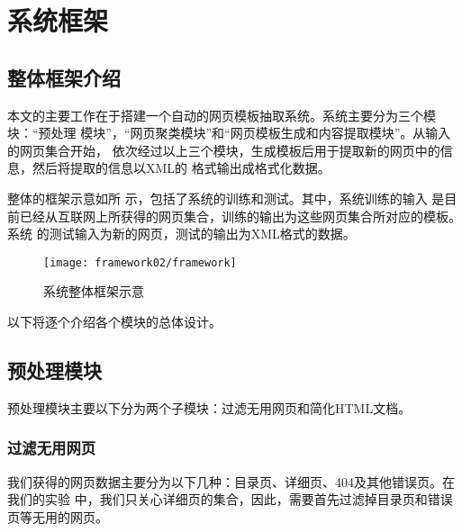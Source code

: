 
\chapter{系统框架}
\label{chap:framework}
\section{整体框架介绍}
\label{sec:wholeframework}
本文的主要工作在于搭建一个自动的网页模板抽取系统。系统主要分为三个模块：“预处理
模块”，“网页聚类模块”和“网页模板生成和内容提取模块”。从输入的网页集合开始，
依次经过以上三个模块，生成模板后用于提取新的网页中的信息，然后将提取的信息以XML的
格式输出成格式化数据。

整体的框架示意如所
示，包括了系统的训练和测试。其中，系统训练的输入
是目前已经从互联网上所获得的网页集合，训练的输出为这些网页集合所对应的模板。系统
的测试输入为新的网页，测试的输出为XML格式的数据。

\begin{figure}
  \centering
  \texttt{[image: framework02/framework]}
  \caption{系统整体框架示意}
  \label{framework:fig:framework}
\end{figure}

以下将逐个介绍各个模块的总体设计。
\section{预处理模块}
\label{sec:filterintro}
预处理模块主要以下分为两个子模块：过滤无用网页和简化HTML文档。
\subsection{过滤无用网页}
\label{sec:filterintro-useless}
我们获得的网页数据主要分为以下几种：目录页、详细页、404及其他错误页。在我们的实验
中，我们只关心详细页的集合，因此，需要首先过滤掉目录页和错误页等无用的网页。

